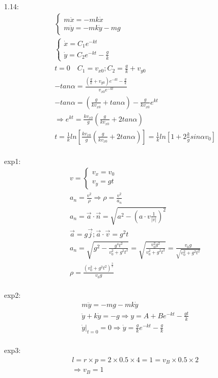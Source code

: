 \documentclass{article}
\begin{document}
1.14:
\begin{align*}
&\begin{cases} 
  m\ddot{x}=-mk\dot{x} \\
  m\ddot{y}=-mk\dot{y}-mg
\end{cases}\\
&\begin{cases} 
  \dot{x}=C_1e^{-kt} \\
  \dot{y}=C_2e^{-kt}-\frac{g}k
\end{cases}\\
&t=0\quad C_1=v_{x0};C_2=\frac gk+v_{y0} \\
&-tan\alpha=\frac{(\frac gk+v_{y0})e^{-kt}-\frac gk}{v_{x0}e^{-kt}} \\
&-tan\alpha=(\frac g{kv_{x0}}+tan\alpha)-\frac{g}{kv_{x0}}e^{kt} \\
&\Rightarrow e^{kt}=\frac{kv_{x0}}{g}(\frac g{kv_{x0}}+2tan\alpha) \\
&t=\frac1kln[\frac{kv_{x0}}g(\frac g{kv_{x0}}+2tan\alpha)]=\frac1kln[1+2\frac kgsin\alpha v_{0}] \\
\end{align*}

exp1:
\begin{align*}
&v=\begin{cases}
v_x=v_0\\
v_y=gt
\end{cases}\\
&a_n=\frac{v^2}{\rho}\Rightarrow \rho=\frac{v^2}{a_n}\\
&a_n= \vec a\cdot \vec n=\sqrt{a^2-(a\cdot v\frac1{|v|})^2} \\
&\vec a=g\vec j ; \vec a \cdot \vec v=g^2t \\
&a_n=\sqrt{g^2-\frac{g^4t^2}{v_0^2+g^2t^2}}=\sqrt{\frac{v_0^2g^2}{v_0^2+g^2t^2}}=\frac{v_0g}{\sqrt{v_0^2+g^2t^2}} \\
&\rho=\frac{(v_0^2+g^2t^2)^{\frac32}}{v_0g} \\
\end{align*}

exp2:
\begin{align*}
&m\ddot{y}=-mg-mk\dot{y} \\
&\ddot{y}+k\dot{y}=-g\Rightarrow y=A+Be^{-kt}-\frac{gt}{k} \\
&\dot{y}|_{t=0}=0\Rightarrow \dot{y}=\frac{g}{k}e^{-kt}-\frac{g}k \\
\end{align*}

exp3:
\begin{align*}
&l=r\times p=2\times 0.5\times 4=1=v_B \times 0.5\times 2 \\
& \Rightarrow v_B =1
\end{align*}
\end{document}
